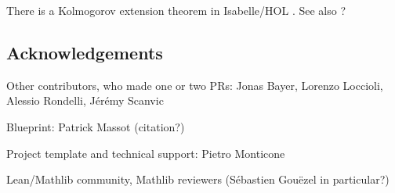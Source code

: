 \documentclass[lean]{DraftAFM}
\begin{document}
There is a Kolmogorov extension theorem in Isabelle/HOL \cite{Immler2012}. See also \cite{holzl2017markov} ?



\subsection{Acknowledgements}

Other contributors, who made one or two PRs: Jonas Bayer, Lorenzo Loccioli, Alessio Rondelli, Jérémy Scanvic

Blueprint: Patrick Massot (citation?)

Project template \cite{Monticone_LeanProject_2025} and technical support: Pietro Monticone

Lean/Mathlib community, Mathlib reviewers (Sébastien Gouëzel in particular?)

\printbibliography
\end{document}
